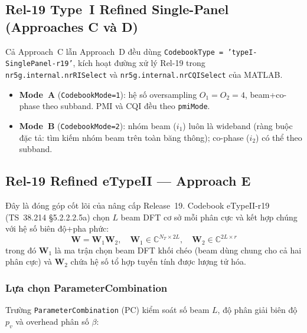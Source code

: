 \documentclass[12pt, a4paper]{article}
\newcommand{\param}[1]{\texttt{#1}}
\begin{document}
\subsection{Rel-19 Type~I Refined Single-Panel (Approaches C và D)}

Cả Approach~C lẫn Approach~D đều dùng
\param{CodebookType = 'typeI-SinglePanel-r19'}, kích hoạt đường xử lý
Rel-19 trong \texttt{nr5g.internal.nrRISelect} và
\texttt{nr5g.internal.nrCQISelect} của MATLAB.

\begin{itemize}
  \item \textbf{Mode~A} (\texttt{CodebookMode=1}): hệ số oversampling
        $O_1 = O_2 = 4$, beam+co-phase theo subband. PMI và CQI đều
        theo \param{pmiMode}.
  \item \textbf{Mode~B} (\texttt{CodebookMode=2}): nhóm beam ($i_1$)
        luôn là wideband (ràng buộc đặc tả: tìm kiếm nhóm beam trên
        toàn băng thông); co-phase ($i_2$) có thể theo subband.
\end{itemize}

\subsection{Rel-19 Refined eTypeII --- Approach E}
\label{sec:etypeii}

Đây là đóng góp cốt lõi của nâng cấp Release~19. Codebook eTypeII-r19
(TS~38.214 \S5.2.2.2.5a) chọn $L$ beam DFT cơ sở mỗi phân cực và kết
hợp chúng với hệ số biên độ+pha phức:
\[
  \mathbf{W} = \mathbf{W}_1 \mathbf{W}_2, \quad
  \mathbf{W}_1 \in \mathbb{C}^{N_T \times 2L}, \quad
  \mathbf{W}_2 \in \mathbb{C}^{2L \times r}
\]
trong đó $\mathbf{W}_1$ là ma trận chọn beam DFT khối chéo (beam dùng
chung cho cả hai phân cực) và $\mathbf{W}_2$ chứa hệ số tổ hợp tuyến
tính được lượng tử hóa.

\subsubsection{Lựa chọn ParameterCombination}

Trường \param{ParameterCombination} (PC) kiểm soát số beam $L$, độ
phân giải biên độ $p_v$ và overhead phân số $\beta$:
\end{document}
